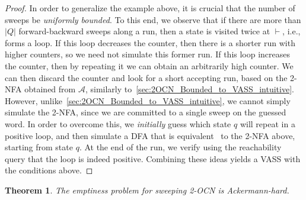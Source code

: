 \documentclass[11pt,a4paper]{amsart}
\newtheorem{theorem}{Theorem}
\theoremstyle{definition}
\newcommand{\lmark}{\vdash}
\newcommand{\cA}{\mathcal{A}}
\begin{document}
\begin{proof}
	In order to generalize the example above, it is crucial that the number of
	sweeps be \emph{uniformly bounded}. To this end, we observe that if there are
	more than $|Q|$ forward-backward sweeps along a run, then a state is visited
	twice at $\lmark$, i.e., forms a loop. If this loop decreases the counter, then
	there is a shorter run with higher counters, so we need not simulate this former
	run.  If this loop increases the counter, then by repeating it we can obtain an
	arbitrarily high counter. We can then discard the counter and look for a short
	accepting run, based on the 2-NFA obtained from $\cA$, similarly
	to~\cref{sec:2OCN_Bounded_to_VASS_intuitive}.  However,
	unlike~\cref{sec:2OCN_Bounded_to_VASS_intuitive}, we cannot simply simulate the
	2-NFA, since we are committed to a single sweep on the guessed word. In order to
	overcome this, we \emph{initially} guess which state \(q\) will repeat in a positive loop,
	and then simulate a DFA that is
	equivalent~\cite{shepherdson1959reduction,rabin1959finite,vardi1989note} to the
	2-NFA above, starting from state $q$. At the end of the run, we verify using the
	reachability query that the loop is indeed positive.
	Combining these ideas yields a VASS with the conditions above.
\end{proof}
%
\begin{theorem}
	\label{lem:ackermann_hard_sweeping} The emptiness problem for sweeping
	2-OCN is Ackermann-hard.
\end{theorem}
\end{document}
